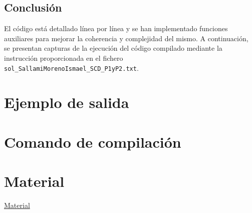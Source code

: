 \documentclass[a4paper,12pt]{article}
\begin{document}
\subsection{Conclusión}
El código está detallado línea por línea y se han implementado funciones auxiliares para mejorar la coherencia y complejidad del mismo. A continuación, se presentan capturas de la ejecución del código compilado mediante la instrucción proporcionada en el fichero \texttt{sol\_SallamiMorenoIsmael\_SCD\_P1yP2.txt}.

\section{Ejemplo de salida}



\section{Comando de compilación}


\section{Material}
\href{https://github.com/ElblogdeIsmael/ElblogdeIsmael.github.io/tree/main/Subjects/Third/SCD/Examenes/Parcial_SCD_Extra}{Material}
\end{document}
